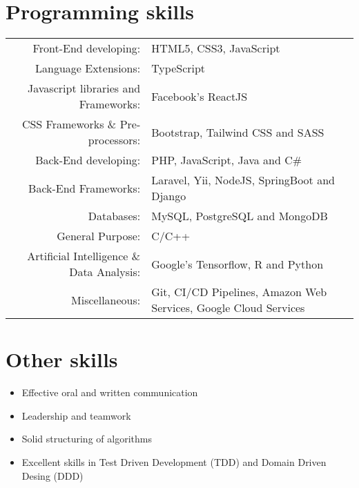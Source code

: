\documentclass[a4paper,10.9pt]{article}
\begin{document}
\section{Programming skills}
\begin{tabular}{rl}
 Front-End developing:& HTML5, CSS3, JavaScript\\
 Language Extensions:& TypeScript\\
 Javascript libraries and Frameworks:& Facebook's ReactJS\\
 CSS Frameworks \& Pre-processors:& Bootstrap, Tailwind CSS and SASS\\
 Back-End developing:& PHP, JavaScript, Java and C\#\\
 Back-End Frameworks:& Laravel, Yii, NodeJS, SpringBoot and Django\\
 Databases:& MySQL, PostgreSQL and MongoDB\\
 General Purpose:& C/C++\\
 Artificial Intelligence \& Data Analysis:& Google's Tensorflow, R and Python\\
Miscellaneous:& Git, CI/CD Pipelines, Amazon Web Services, Google Cloud Services
\end{tabular}

\section{Other skills}

\begin{itemize}
	\item Effective oral and written communication
\item Leadership and teamwork
\item Solid structuring of algorithms
\item Excellent skills in Test Driven Development (TDD) and Domain Driven Desing (DDD) 
\end{itemize}
\end{document}

